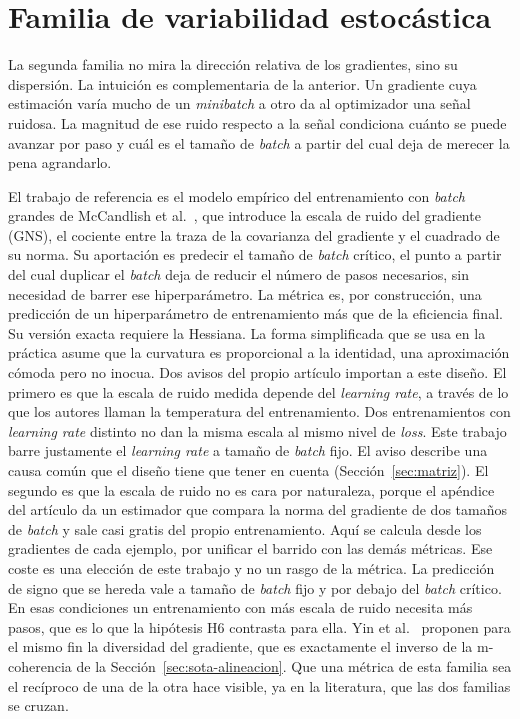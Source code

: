 \section{Familia de variabilidad estocástica}
\label{sec:sota-variabilidad}

La segunda familia no mira la dirección relativa de los gradientes, sino su dispersión. La intuición es complementaria de la anterior. Un gradiente cuya estimación varía mucho de un \emph{minibatch} a otro da al optimizador una señal ruidosa. La magnitud de ese ruido respecto a la señal condiciona cuánto se puede avanzar por paso y cuál es el tamaño de \emph{batch} a partir del cual deja de merecer la pena agrandarlo.

El trabajo de referencia es el modelo empírico del entrenamiento con \emph{batch} grandes de McCandlish et al.~\cite{mccandlish2018empirical}, que introduce la escala de ruido del gradiente (GNS), el cociente entre la traza de la covarianza del gradiente y el cuadrado de su norma. Su aportación es predecir el tamaño de \emph{batch} crítico, el punto a partir del cual duplicar el \emph{batch} deja de reducir el número de pasos necesarios, sin necesidad de barrer ese hiperparámetro. La métrica es, por construcción, una predicción de un hiperparámetro de entrenamiento más que de la eficiencia final. Su versión exacta requiere la Hessiana. La forma simplificada que se usa en la práctica asume que la curvatura es proporcional a la identidad, una aproximación cómoda pero no inocua. Dos avisos del propio artículo importan a este diseño. El primero es que la escala de ruido medida depende del \emph{learning rate}, a través de lo que los autores llaman la temperatura del entrenamiento. Dos entrenamientos con \emph{learning rate} distinto no dan la misma escala al mismo nivel de \emph{loss}. Este trabajo barre justamente el \emph{learning rate} a tamaño de \emph{batch} fijo. El aviso describe una causa común que el diseño tiene que tener en cuenta (Sección~\ref{sec:matriz}). El segundo es que la escala de ruido no es cara por naturaleza, porque el apéndice del artículo da un estimador que compara la norma del gradiente de dos tamaños de \emph{batch} y sale casi gratis del propio entrenamiento. Aquí se calcula desde los gradientes de cada ejemplo, por unificar el barrido con las demás métricas. Ese coste es una elección de este trabajo y no un rasgo de la métrica. La predicción de signo que se hereda vale a tamaño de \emph{batch} fijo y por debajo del \emph{batch} crítico. En esas condiciones un entrenamiento con más escala de ruido necesita más pasos, que es lo que la hipótesis H6 contrasta para ella. Yin et al.~\cite{yin2018gradient} proponen para el mismo fin la diversidad del gradiente, que es exactamente el inverso de la m-coherencia de la Sección~\ref{sec:sota-alineacion}. Que una métrica de esta familia sea el recíproco de una de la otra hace visible, ya en la literatura, que las dos familias se cruzan.

